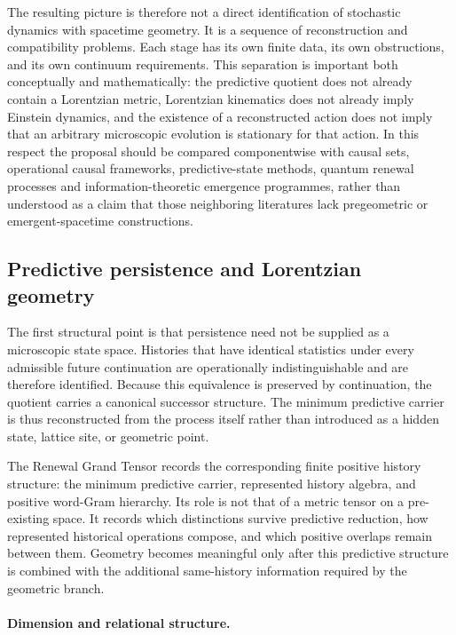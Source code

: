 \documentclass[11pt]{article}
\numberwithin{equation}{section}
\theoremstyle{definition}
\theoremstyle{remark}
\begin{document}
The resulting picture is therefore not a direct identification of stochastic
dynamics with spacetime geometry.  It is a sequence of reconstruction and
compatibility problems.  Each stage has its own finite data, its own
obstructions, and its own continuum requirements.  This separation is
important both conceptually and mathematically: the predictive quotient does
not already contain a Lorentzian metric, Lorentzian kinematics does not
already imply Einstein dynamics, and the existence of a reconstructed action
does not imply that an arbitrary microscopic evolution is stationary for
that action.  In this respect the proposal should be compared componentwise
with causal sets, operational causal frameworks, predictive-state methods,
quantum renewal processes and information-theoretic emergence programmes,
rather than understood as a claim that those neighboring literatures lack
pregeometric or emergent-spacetime constructions.


\subsection{Predictive persistence and Lorentzian geometry}

The first structural point is that persistence need not be supplied as a
microscopic state space.  Histories that have identical statistics under
every admissible future continuation are operationally indistinguishable and
are therefore identified.  Because this equivalence is preserved by
continuation, the quotient carries a canonical successor structure.  The
minimum predictive carrier is thus reconstructed from the process itself
rather than introduced as a hidden state, lattice site, or geometric point.

The Renewal Grand Tensor records the corresponding finite positive
history structure: the minimum predictive carrier, represented history
algebra, and positive word-Gram hierarchy.  Its role is not that of a metric
tensor on a pre-existing space.  It records which distinctions survive
predictive reduction, how represented historical operations compose, and
which positive overlaps remain between them.  Geometry becomes meaningful
only after this predictive structure is combined with the additional
same-history information required by the geometric branch.

\paragraph{Dimension and relational structure.}
\end{document}
